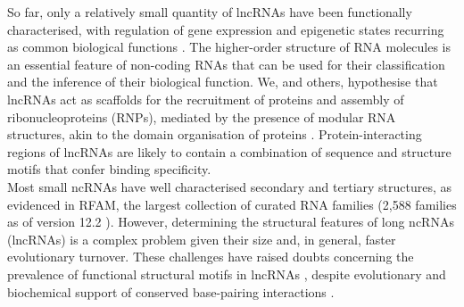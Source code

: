 \documentclass{bmcart}
\begin{document}
So far, only a relatively small quantity of lncRNAs have been functionally characterised, 
with regulation of gene expression and epigenetic states recurring as common 
biological functions \cite{morris2014rise,engreitz2016long}. 
The higher-order structure of RNA molecules is an essential feature of non-coding 
RNAs that can be used for their classification and the inference of their biological function. 
We, and others, hypothesise that lncRNAs act as scaffolds for the recruitment of 
proteins and assembly of ribonucleoproteins (RNPs), mediated by the presence 
of modular RNA structures, akin to the domain organisation of proteins 
\cite{zappulla2006rna,hogg2008structured,rinn2012genome,mercer2013structure,smith2013widespread,chujo2016architectural,blythe2016ins}. 
Protein-interacting regions of lncRNAs are likely to contain a combination 
of sequence and structure motifs that confer binding specificity.\\

Most small ncRNAs have well characterised secondary and tertiary structures, 
as evidenced in RFAM, the largest collection of curated RNA families (2,588 families as of version 12.2 \cite{rfam12}). 
However, determining the structural features of  long ncRNAs (lncRNAs) is a complex problem given their size and, 
in general,  faster evolutionary turnover.  
 These challenges have raised doubts concerning the prevalence of functional structural  motifs in lncRNAs \cite{eddy2014computational,rivas2016statistical}, 
 despite evolutionary and biochemical support of conserved base-pairing interactions \cite{smith2013widespread,spitale2015structural,lu2016rna}.\\

  
\end{document}
